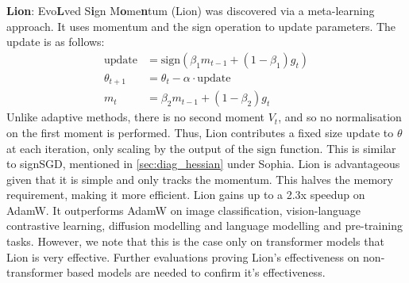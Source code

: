 \textbf{Lion}: Evo\textbf{L}ved S\textbf{i}gn M\textbf{o}me\textbf{n}tum (Lion) was discovered via a meta-learning approach. It uses momentum and the sign operation to update parameters. The update is as follows:
\begin{align}
    \text{update} &= \text{sign}(\beta_1 m_{t-1} + (1 - \beta_1)g_t) \\ 
    \theta_{t+1} &= \theta_t - \alpha \cdot \text{update} \\ 
    m_t &= \beta_2 m_{t-1} + (1 - \beta_2)g_t
\end{align}
Unlike adaptive methods, there is no second moment $V_t$, and so no normalisation on the first moment is performed. Thus, Lion contributes a fixed size update to $\theta$ at each iteration, only scaling by the output of the $\text{sign}$ function. This is similar to signSGD, mentioned in \cref{sec:diag_hessian} under Sophia. Lion is advantageous given that it is simple and only tracks the momentum. This halves the memory requirement, making it more efficient. Lion gains up to a 2.3x speedup on AdamW. It outperforms AdamW on image classification, vision-language contrastive learning, diffusion modelling and language modelling and pre-training tasks. However, we note that this is the case only on transformer models that Lion is very effective. Further evaluations proving Lion's effectiveness on non-transformer based models are needed to confirm it's effectiveness.




